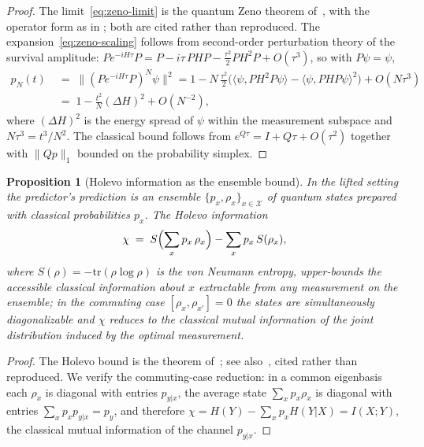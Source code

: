 \documentclass[11pt,a4paper]{article}
\theoremstyle{plain}
\newtheorem{proposition}[theorem]{Proposition}
\theoremstyle{definition}
\theoremstyle{remark}
\begin{document}
\begin{proof}
The limit~\eqref{eq:zeno-limit} is the quantum Zeno theorem
of~\cite{misra1977}, with the operator form as in
\cite{facchi2008}; both are cited rather than reproduced. The
expansion~\eqref{eq:zeno-scaling} follows from second-order
perturbation theory of the survival amplitude:
$Pe^{-iH\tau}P=P-i\tau\,PHP-\tfrac{\tau^{2}}{2}PH^{2}P+O(\tau^{3})
$, so with $P\psi=\psi$,
\[
\begin{aligned}
  p_N(t) &\;=\; \bigl\lVert(Pe^{-iH\tau}P)^{N}\psi\bigr\rVert^{2}
  = 1-N\,\tfrac{\tau^{2}}{2}\bigl(\langle\psi,PH^{2}P\psi
  \rangle-\langle\psi,PHP\psi\rangle^{2}\bigr)+O(N\tau^{3})\\[2pt]
  &\;=\; 1-\tfrac{t^{2}}{N}(\Delta H)^{2}+O(N^{-2}),
\end{aligned}
\]
where $(\Delta H)^{2}$ is the energy spread of $\psi$ within the
measurement subspace and $N\tau^{3}=t^{3}/N^{2}$. The classical
bound follows from $e^{Q\tau}=I+Q\tau+O(\tau^{2})$ together with
$\lVert Qp\rVert_{1}$ bounded on the probability simplex.
\end{proof}

\begin{proposition}[Holevo information as the ensemble bound]
\label{prop:holevo}
In the lifted setting the predictor's prediction is an ensemble
$\{p_x,\rho_x\}_{x\in\mathcal X}$ of quantum states prepared with
classical probabilities $p_x$. The Holevo
information~\cite{holevo1973}
\begin{equation}\label{eq:holevo}
  \chi \;=\; S\Bigl(\sum_x p_x\,\rho_x\Bigr)-\sum_x p_x\,S(\rho_x),
\end{equation}
where $S(\rho)=-\mathrm{tr}(\rho\log\rho)$ is the von Neumann
entropy, upper-bounds the accessible classical information about
$x$ extractable from any measurement on the ensemble; in the
commuting case $[\rho_x,\rho_{x'}]=0$ the states are simultaneously
diagonalizable and $\chi$ reduces to the classical mutual
information of the joint distribution induced by the optimal
measurement.
\end{proposition}

\begin{proof}
The Holevo bound is the theorem of~\cite{holevo1973}; see
also~\cite{nielsen2000}, cited rather than reproduced. We verify
the commuting-case reduction: in a common eigenbasis each
$\rho_x$ is diagonal with entries $p_{y|x}$, the average state
$\sum_xp_x\rho_x$ is diagonal with entries
$\sum_xp_xp_{y|x}=p_y$, and therefore
$\chi=H(Y)-\sum_xp_xH(Y\vert X)=I(X;Y)$, the classical mutual
information of the channel $p_{y|x}$.
\end{proof}
\end{document}
